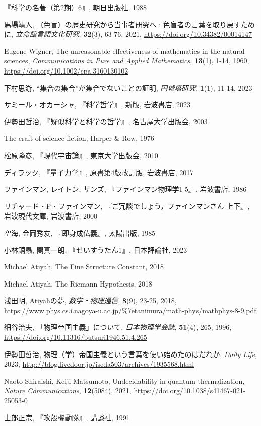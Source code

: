 \documentclass[10pt, a5paper, twoside]{jsarticle}
\theoremstyle{definition}
\begin{document}
\begin{thebibliography}{99}
         『科学の名著（第2期）6』, 朝日出版社, 1988

         馬場靖人, 〈色盲〉の歴史研究から当事者研究へ : 色盲者の言葉を取り戻すために, \textit{立命館言語文化研究}, \textbf{32}(3), 63-76, 2021, \url{https://doi.org/10.34382/00014147}

         Eugene Wigner, The unreasonable effectiveness of mathematics in the natural sciences, \textit{Communications in Pure and Applied Mathematics}, \textbf{13}(1), 1-14, 1960, \url{https://doi.org/10.1002/cpa.3160130102}

         下村思游, “集合の集合”が集合でないことの証明, \textit{円城塔研究}, \textbf{1}(1), 11-14, 2023

         サミール・オカーシャ, 『科学哲学』, 新版, 岩波書店, 2023

         伊勢田哲治, 『疑似科学と科学の哲学』, 名古屋大学出版会, 2003

         The craft of science fiction, Harper \& Row, 1976

         松原隆彦, 『現代宇宙論』, 東京大学出版会, 2010

         ディラック, 『量子力学』, 原書第4版改訂版, 岩波書店, 2017

         ファインマン, レイトン, サンズ, 『ファインマン物理学1-5』, 岩波書店, 1986

         リチャード・P・ファインマン, 『ご冗談でしょう，ファインマンさん 上下』, 岩波現代文庫, 岩波書店, 2000

         空海, 金岡秀友, 『即身成仏義』, 太陽出版, 1985

         小林銅蟲, 関真一朗, 『せいすうたん1』, 日本評論社, 2023

         Michael Atiyah, The Fine Structure Constant, 2018

         Michael Atiyah, The Riemann Hypothesis, 2018

         浅田明, Atiyahの夢, \textit{数学・物理通信}, \textbf{8}(9), 23-25, 2018, \url{https://www.phys.cs.i.nagoya-u.ac.jp/\%7etanimura/math-phys/mathphys-8-9.pdf}

         細谷治夫, 「物理帝国主義」について, \textit{日本物理学会誌}, \textbf{51}(4), 265, 1996, \url{https://doi.org/10.11316/butsuri1946.51.4.265}

         伊勢田哲治, 物理（学）帝国主義という言葉を使い始めたのはだれか, \textit{Daily Life}, 2023, \url{http://blog.livedoor.jp/iseda503/archives/1935568.html}

         Naoto Shiraishi, Keiji Matsumoto, Undecidability in quantum thermalization, \textit{Nature Communications}, \textbf{12}(5084), 2021, \url{https://doi.org/10.1038/s41467-021-25053-0}

         士郎正宗, 『攻殻機動隊』, 講談社, 1991

    \end{thebibliography}
\end{document}
